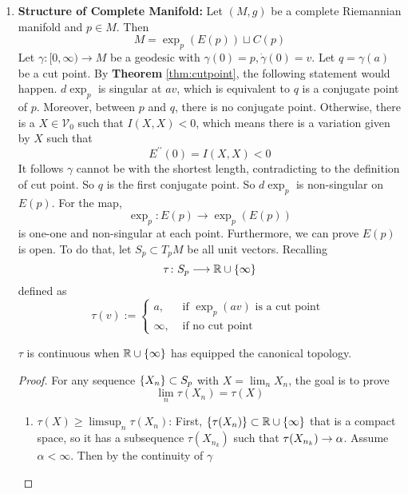 \begin{enumerate}[label=\arabic{*}.]
	\item \textbf{Structure of Complete Manifold:} Let $(M,g)$ be a complete Riemannian manifold and $p \in M$. Then
	\begin{equation*}
		M = \exp _p(E(p)) \sqcup C(p)
	\end{equation*}
	Let $\gamma:[0, \infty) \rightarrow M$ be a geodesic with $\gamma(0)=p, \dot{\gamma}(0)=v$. Let $q = \gamma(a)$ be a cut point. By \textbf{Theorem} \ref{thm:cutpoint}, the following statement would happen. $d\exp_p$ is singular at $av$, which is equivalent to $q$ is a conjugate point of $p$. Moreover, between $p$ and $q$, there is no conjugate point. Otherwise, there is a $X \in \mathcal{V}_0$ such that $I(X,X) < 0$, which means there is a variation given by $X$ such that
	\begin{equation*}
		E^{\prime\prime}(0) = I(X,X) < 0
	\end{equation*}
	It follows $\gamma$ cannot be with the shortest length, contradicting to the definition of cut point. So $q$ is the first conjugate point. So $d\exp_p$ is non-singular on $E(p)$. For the map,
	\begin{equation*}
		\exp_p \colon E(p) \longrightarrow \exp_p(E(p))
	\end{equation*}
	is one-one and non-singular at each point. Furthermore, we can prove $E(p)$ is open. To do that, let $S_p \subset T_pM$ be all unit vectors. Recalling
	\begin{equation*}
		\tau \colon S_p \longrightarrow \mathbb{R}\cup\left\{\infty\right\}
	\end{equation*}
	defined as
	\begin{equation*}
		\tau(v):= \begin{cases}a, & \text { if } \exp _p(a v) \text { is a cut point } \\ \infty, & \text { if no cut point }\end{cases}
	\end{equation*}
	\begin{thm}
		$\tau$ is continuous when $\mathbb{R} \cup \left\{\infty\right\}$ has equipped the canonical topology.
	\end{thm}
	\begin{proof}
		For any sequence $\left\{X_n\right\} \subset S_p$ with $X = \lim_n X_n$, the goal is to prove
		\begin{equation*}
			\lim_n \tau(X_n) = \tau(X)
		\end{equation*}
		\begin{enumerate}[label=\Roman*.]
			\item $\tau(X) \geq \limsup_n \tau(X_n)$: First, $\left\{\tau(X_n)\right\} \subset \mathbb{R} \cup \left\{\infty\right\}$ that is a compact space, so it has a subsequence $\tau(X_{n_k})$ such that $\tau(X_{n_k}) \rightarrow \alpha$. Assume $\alpha < \infty$. Then by the continuity of $\gamma$

\end{enumerate}
\end{proof}
\end{enumerate}
